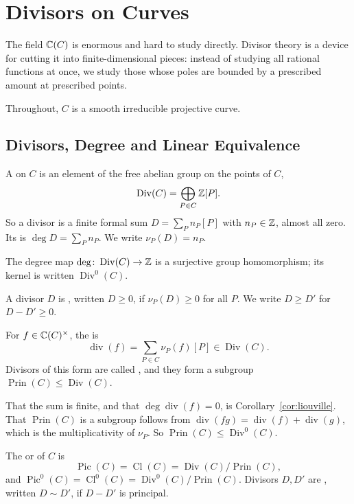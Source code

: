 \documentclass[a4paper]{scrartcl}
\DeclareMathOperator{\Div}{Div}
\DeclareMathOperator{\Divv}{div}
\DeclareMathOperator{\Prin}{Prin}
\DeclareMathOperator{\Pic}{Pic}
\DeclareMathOperator{\Cl}{Cl}
\begin{document}
\section{Divisors on Curves}\label{sec:divisors}

The field $\mathbb{C}(C)$ is enormous and hard to study directly. Divisor theory is a device for cutting it into finite-dimensional pieces: instead of studying all rational functions at once, we study those whose poles are bounded by a prescribed amount at prescribed points.

Throughout, $C$ is a smooth irreducible projective curve.

\subsection{Divisors, Degree and Linear Equivalence}

\begin{definition}[Divisor]
	A  on $C$ is an element of the free abelian group on the points of $C$,
	$$\Div(C) = \bigoplus_{P \in C}\Z[P].$$
	So a divisor is a finite formal sum $D = \sum_P n_P[P]$ with $n_P \in \mathbb{Z}$, almost all zero. Its  is $\deg D = \sum_P n_P$. We write $\nu_P(D) = n_P$.
\end{definition}

The degree map $\deg \colon \Div(C)\to\Z$ is a surjective group homomorphism; its kernel is written $\Div^0(C)$.

\begin{definition}
	A divisor $D$ is , written $D \geq 0$, if $\nu_P(D)\geq 0$ for all $P$. We write $D \geq D'$ for $D - D' \geq 0$.
\end{definition}

\begin{definition}
	For $f \in \mathbb{C}(C)^\times$, the  is
	$$\Divv(f) = \sum_{P \in C}\nu_P(f)[P] \in \Div(C).$$
	Divisors of this form are called , and they form a subgroup $\Prin(C) \leq \Div(C)$.
\end{definition}

That the sum is finite, and that $\deg\Divv(f) = 0$, is Corollary~\ref{cor:liouville}. That $\Prin(C)$ is a subgroup follows from $\Divv(fg) = \Divv(f) + \Divv(g)$, which is the multiplicativity of $\nu_P$. So $\Prin(C) \leq \Div^0(C)$.

\begin{definition}
	The  or  of $C$ is
	$$\Pic(C) = \Cl(C) = \Div(C)/\Prin(C),$$
	and $\Pic^0(C) = \Cl^0(C) = \Div^0(C)/\Prin(C)$. Divisors $D, D'$ are , written $D \sim D'$, if $D - D'$ is principal.
\end{definition}
\end{document}
